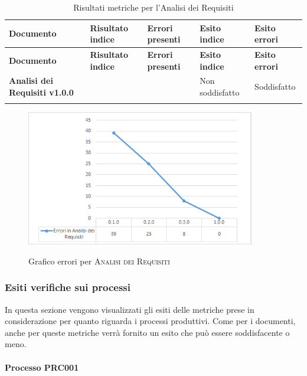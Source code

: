 \documentclass[../piano-di-qualifica.tex]{subfiles}
\begin{document}
\renewcommand{\arraystretch}{2} %
\begin{longtable}[H]{>{\centering\bfseries}m{6cm} >{\centering}m{2cm} >{\centering}m{2.5cm} >{\centering}m{2.5cm} >{\centering\arraybackslash}m{2.5cm}}  
  \rowcolor{lightgray}
  {\textbf{Documento}} & {\textbf{Risultato indice}} & {\textbf{Errori presenti}} & {\textbf{Esito indice}} & {\textbf{Esito errori}}  \\
  \endfirsthead%
  \rowcolor{lightgray}
  {\textbf{Documento}} & {\textbf{Risultato indice}} & {\textbf{Errori presenti}} & {\textbf{Esito indice}} & {\textbf{Esito errori}}  \\
  \endhead%
  \textbf{Analisi dei Requisiti v1.0.0} &                  & 0               & Non soddisfatto & Soddisfatto \\
  \caption{Risultati metriche per l'Analisi dei Requisiti}
  \label{tab:my-table}
\end{longtable}

    \begin{figure}[H]
        \centering
        \includegraphics[width=10cm]{img/erroriAnalisi.png}
        \label{fig:scice_documenti}
        \caption{Grafico errori per \textsc{Analisi dei Requisiti}}
    \end{figure}

\subsubsection{Esiti verifiche sui processi}
\label{sub:esiti_verifiche_sui_processi}
In questa sezione vengono visualizzati gli esiti delle metriche prese in considerazione per quanto riguarda i processi produttivi.
Come per i documenti, anche per queste metriche verrà fornito un esito che può essere soddisfacente o meno.

\paragraph{Processo PRC001}
\label{sub:processo_PRC001}
\end{document}
